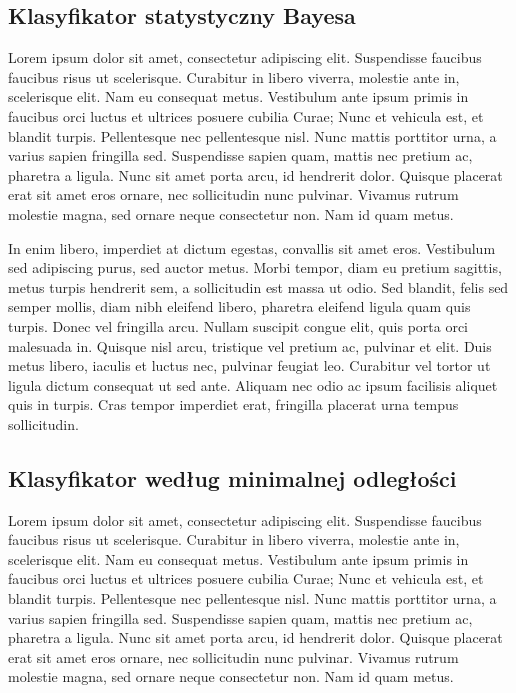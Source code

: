 	\subsection{Klasyfikator statystyczny Bayesa}
	Lorem ipsum dolor sit amet, consectetur adipiscing elit. Suspendisse faucibus faucibus risus ut scelerisque. Curabitur in libero viverra, molestie ante in, scelerisque elit. Nam eu consequat metus. Vestibulum ante ipsum primis in faucibus orci luctus et ultrices posuere cubilia Curae; Nunc et vehicula est, et blandit turpis. Pellentesque nec pellentesque nisl. Nunc mattis porttitor urna, a varius sapien fringilla sed. Suspendisse sapien quam, mattis nec pretium ac, pharetra a ligula. Nunc sit amet porta arcu, id hendrerit dolor. Quisque placerat erat sit amet eros ornare, nec sollicitudin nunc pulvinar. Vivamus rutrum molestie magna, sed ornare neque consectetur non. Nam id quam metus.

	In enim libero, imperdiet at dictum egestas, convallis sit amet eros. Vestibulum sed adipiscing purus, sed auctor metus. Morbi tempor, diam eu pretium sagittis, metus turpis hendrerit sem, a sollicitudin est massa ut odio. Sed blandit, felis sed semper mollis, diam nibh eleifend libero, pharetra eleifend ligula quam quis turpis. Donec vel fringilla arcu. Nullam suscipit congue elit, quis porta orci malesuada in. Quisque nisl arcu, tristique vel pretium ac, pulvinar et elit. Duis metus libero, iaculis et luctus nec, pulvinar feugiat leo. Curabitur vel tortor ut ligula dictum consequat ut sed ante. Aliquam nec odio ac ipsum facilisis aliquet quis in turpis. Cras tempor imperdiet erat, fringilla placerat urna tempus sollicitudin.
	
	\subsection{Klasyfikator według minimalnej odległości}
	Lorem ipsum dolor sit amet, consectetur adipiscing elit. Suspendisse faucibus faucibus risus ut scelerisque. Curabitur in libero viverra, molestie ante in, scelerisque elit. Nam eu consequat metus. Vestibulum ante ipsum primis in faucibus orci luctus et ultrices posuere cubilia Curae; Nunc et vehicula est, et blandit turpis. Pellentesque nec pellentesque nisl. Nunc mattis porttitor urna, a varius sapien fringilla sed. Suspendisse sapien quam, mattis nec pretium ac, pharetra a ligula. Nunc sit amet porta arcu, id hendrerit dolor. Quisque placerat erat sit amet eros ornare, nec sollicitudin nunc pulvinar. Vivamus rutrum molestie magna, sed ornare neque consectetur non. Nam id quam metus.

